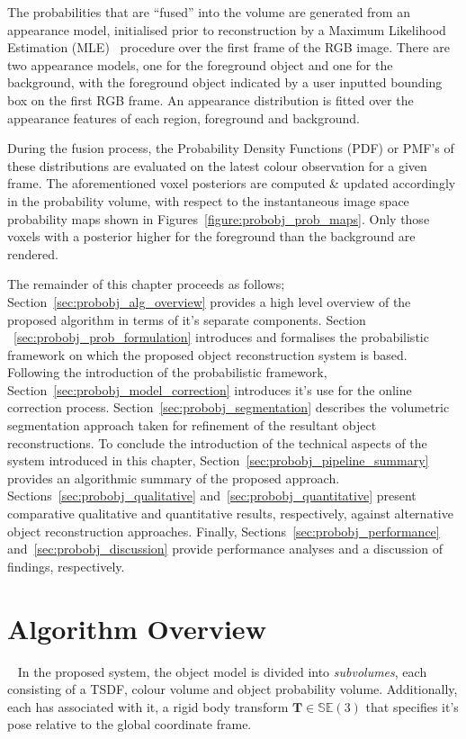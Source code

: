 The probabilities that are ``fused'' into the volume are generated from an
appearance model, initialised prior to reconstruction by a Maximum Likelihood 
Estimation (MLE)~\cite{BishopPRML} procedure over the first frame of the RGB image. 
There are two appearance models, one for the foreground object and one for the 
background, with the foreground object indicated by a user inputted bounding box 
on the first RGB frame. An appearance distribution is fitted over the appearance 
features of each region, foreground and background. 

During the fusion process, the Probability Density Functions (PDF) or PMF's of 
these distributions are evaluated on the latest colour observation for a given frame. The aforementioned 
voxel posteriors are computed \& updated accordingly in the probability volume, with respect to the 
instantaneous image space probability maps shown in Figures~\ref{figure:probobj_prob_maps}. Only those 
voxels with a posterior higher for the foreground than the background are rendered.

The remainder of this chapter proceeds as follows; Section~\ref{sec:probobj_alg_overview} provides a high 
level overview of the proposed algorithm in terms of it's separate components. Section
~\ref{sec:probobj_prob_formulation} introduces and formalises the probabilistic framework on which the 
proposed object reconstruction system is based. Following the introduction of the probabilistic framework, 
Section~\ref{sec:probobj_model_correction} introduces it's use for the online correction process. 
Section~\ref{sec:probobj_segmentation} describes the volumetric segmentation approach taken for refinement 
of the resultant object reconstructions. To conclude the introduction of the technical aspects of the system 
introduced in this chapter, Section~\ref{sec:probobj_pipeline_summary} provides an algorithmic summary of the 
proposed approach. Sections~\ref{sec:probobj_qualitative} and~\ref{sec:probobj_quantitative} present comparative 
qualitative and quantitative results, respectively, against alternative object reconstruction approaches. Finally, 
Sections~\ref{sec:probobj_performance} and~\ref{sec:probobj_discussion} provide performance analyses and a 
discussion of findings, respectively.

\section{Algorithm Overview}
~\label{sec:probobj_alg_overview}
In the proposed system, the object model is divided into \textit{subvolumes}, 
each consisting of a TSDF, colour volume and object probability volume.
Additionally, each has associated with it, a rigid body transform 
\(\bm{T} \in \mathbb{SE}(3)\) that specifies it's pose relative to the global 
coordinate frame.


